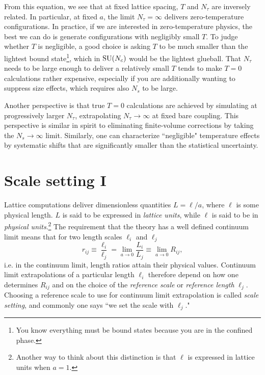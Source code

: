 From this equation, we see that at fixed lattice spacing, $T$ and $N_\tau$ are
inversely related. In particular, at fixed $a$, the limit $N_\tau=\infty$
delivers zero-temperature configurations. In practice, if we are interested in
zero-temperature physics, the best we can do is generate configurations with
negligibly small $T$. To judge whether $T$ is negligible, a good choice is
asking $T$ to be much smaller than the lightest bound state\footnote{You know
everything must be bound states because you are in the confined phase.}, 
which in $\operatorname{SU}(N_c)$ would be the lightest glueball. That $N_\tau$ needs to be
large enough to deliver a relatively small $T$ tends to make $T=0$ calculations
rather expensive, especially if you are additionally wanting to suppress size
effects, which requires also $N_s$ to be large.

Another perspective is that true $T=0$ calculations are achieved by simulating
at progressively larger $N_\tau$, extrapolating $N_\tau\to\infty$ at fixed
bare coupling. This perspective is similar in spirit to eliminating
finite-volume corrections by taking the $N_s\to\infty$ limit. Similarly, one can
characterize ``negligible" temperature effects by systematic shifts that are
significantly smaller than the statistical uncertainty.

\section{Scale setting I}\label{sec:refscales}


Lattice computations deliver dimensionless quantities $L=\ell/a$, where 
$\ell$ is some physical length. $L$ is said to be expressed in {\it lattice
units}, while $\ell$ is said to be in {\it physical
units}.\footnote{Another way to think about this
distinction is that $\ell$ is expressed in lattice units when $a=1$.}
The requirement that the theory has a 
well defined continuum limit means that for two length scales 
$\ell_i$ and $\ell_j$
\begin{equation}
  r_{ij}\equiv\frac{\ell_i}{\ell_j}=\lim_{a\to 0}\frac{L_i}{L_j}
        \equiv\lim_{a\to 0}R_{ij},
\end{equation}
i.e. in the continuum limit, length ratios attain their physical values.
Continuum limit extrapolations of a particular length $\ell_i$ therefore
depend on how one determines $R_{ij}$ and on the choice of the
{\it reference scale} or {\it reference length} $\ell_j$. 
Choosing a reference scale to use for continuum limit extrapolation
is called {\it scale setting}, and commonly one says
``we set the scale with $\ell_j$." 


